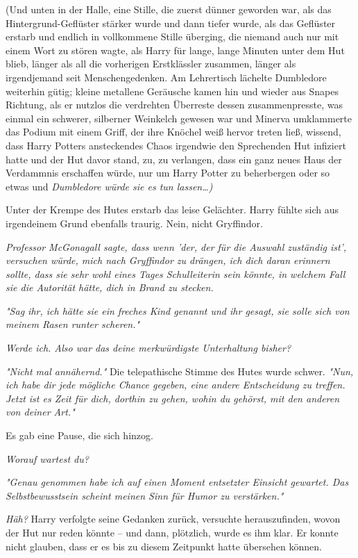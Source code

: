 {(Und unten in der Halle, eine Stille, die zuerst dünner geworden war, als das Hintergrund-Geflüster stärker wurde und dann tiefer wurde, als das Geflüster erstarb und endlich in vollkommene Stille überging, die niemand auch nur mit einem Wort zu stören wagte, als Harry für lange, lange Minuten unter dem Hut blieb, länger als all die vorherigen Erstklässler zusammen, länger als irgendjemand seit Menschengedenken. Am Lehrertisch lächelte Dumbledore weiterhin gütig; kleine metallene Geräusche kamen hin und wieder aus Snapes Richtung, als er nutzlos die verdrehten Überreste dessen zusammenpresste, was einmal ein schwerer, silberner Weinkelch gewesen war und Minerva umklammerte das Podium mit einem Griff, der ihre Knöchel weiß hervor treten ließ, wissend, dass Harry Potters ansteckendes Chaos irgendwie den Sprechenden Hut infiziert hatte und der Hut davor stand, zu, zu verlangen, dass ein ganz neues Haus der Verdammnis erschaffen würde, nur um Harry Potter zu beherbergen oder so etwas und \emph{Dumbledore würde sie es tun lassen…)}

Unter der Krempe des Hutes erstarb das leise Gelächter. Harry fühlte sich aus irgendeinem Grund ebenfalls traurig. Nein, nicht Gryffindor.

\emph{Professor McGonagall sagte, dass wenn 'der, der für die Auswahl zuständig ist', versuchen würde, mich nach Gryffindor zu drängen, ich dich daran erinnern sollte, dass sie sehr wohl eines Tages Schulleiterin sein könnte, in welchem Fall sie die Autorität hätte, dich in Brand zu stecken.}

\emph{"Sag ihr, ich hätte sie ein freches Kind genannt und ihr gesagt, sie solle sich von meinem Rasen runter scheren."}

\emph{Werde ich. Also war das deine merkwürdigste Unterhaltung bisher?}

\emph{"Nicht mal annähernd."} Die telepathische Stimme des Hutes wurde schwer. \emph{"Nun, ich habe dir jede mögliche Chance gegeben, eine andere Entscheidung zu treffen. Jetzt ist es Zeit für dich, dorthin zu gehen, wohin du gehörst, mit den anderen von deiner Art."}

Es gab eine Pause, die sich hinzog.

\emph{Worauf wartest du?}

\emph{"Genau genommen habe ich auf einen Moment entsetzter Einsicht gewartet. Das Selbstbewusstsein scheint meinen Sinn für Humor zu verstärken."}

\emph{Häh?} Harry verfolgte seine Gedanken zurück, versuchte herauszufinden, wovon der Hut nur reden könnte -- und dann, plötzlich, wurde es ihm klar. Er konnte nicht glauben, dass er es bis zu diesem Zeitpunkt hatte übersehen können.

}
